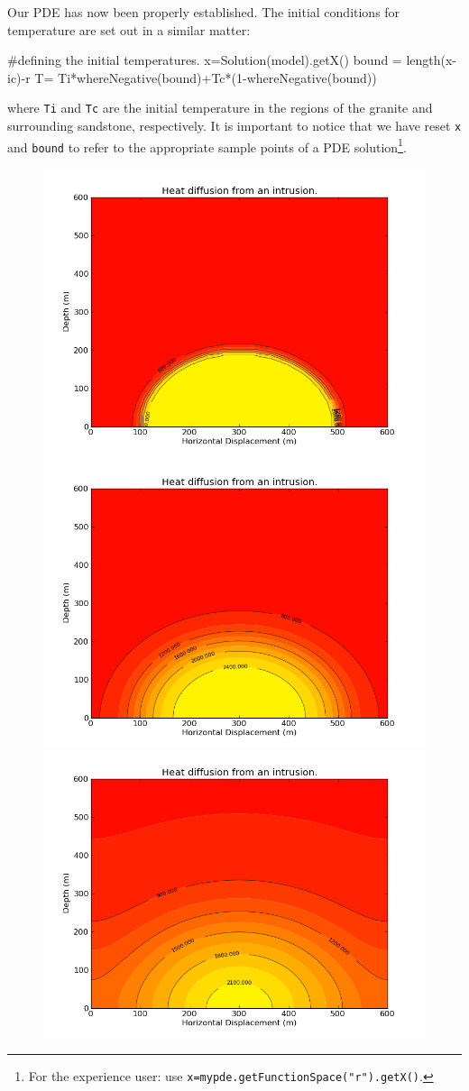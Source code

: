 Our PDE has now been properly established. The initial conditions for temperature are set out in a similar matter:
\begin{python}
#defining the initial temperatures.
x=Solution(model).getX()
bound = length(x-ic)-r
T= Ti*whereNegative(bound)+Tc*(1-whereNegative(bound))
\end{python}
where \verb|Ti| and \verb|Tc| are the initial temperature
in the regions of the granite and surrounding sandstone, respectively. It is important to
notice that we have reset \verb|x| and \verb|bound| to refer to the appropriate 
sample points of a PDE solution\footnote{For the experience user: use \texttt{x=mypde.getFunctionSpace("r").getX()}.}.

\begin{figure}[ht]
\centerline{\includegraphics[width=4.in]{figures/heatrefraction001.png}}
\centerline{\includegraphics[width=4.in]{figures/heatrefraction030.png}}
\centerline{\includegraphics[width=4.in]{figures/heatrefraction200.png}}

\end{figure}
